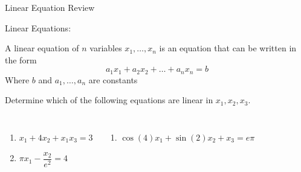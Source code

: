 \documentclass[xcoler=dvipsnames, aspectratio=169]{beamer}
\date{Systems of Linear Equations}
\begin{document}
\begin{frame}{Linear Equation Review}
    \begin{defn}
        Linear Equations:

        A linear equation of $n$ variables $x_1,\dots, x_n$ is an equation that can be written in the form
        \begin{equation*}
            a_1x_1 + a_2x_2 + \dots + a_nx_n = b
        \end{equation*}
        Where
        $b$ and $a_1,\dots,a_n$ are constants
    \end{defn}
    \pause
    \begin{practice}
        Determine which of the following equations are linear in $x_1,x_2,x_3$.

        \begin{columns}
            \begin{enumerate}
                \item $x_1 + 4x_2 + x_1x_3 = 3$
                \item $\pi x_1 - \dfrac{x_2}{e^2} = 4$
            \end{enumerate}
            \begin{enumerate}\addtocounter{enumi}{2}
                \item $\cos{(4)}x_1 + \sin{(2)}x_2 + x_3 = e\pi$
            \end{enumerate}
        \end{columns}
    \end{practice}
\end{frame}
\end{document}
